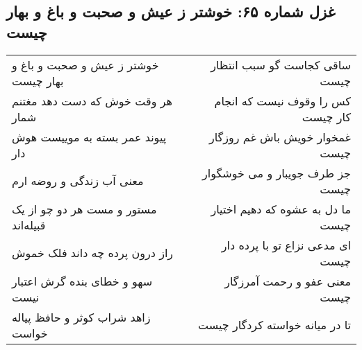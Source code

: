 \begin{center}
\section*{غزل شماره ۶۵: خوشتر ز عیش و صحبت و باغ و بهار چیست}
\label{sec:sh065}
\begin{longtable}{l p{0.5cm} r}
خوشتر ز عیش و صحبت و باغ و بهار چیست
&&
ساقی کجاست گو سبب انتظار چیست
\\
هر وقت خوش که دست دهد مغتنم شمار
&&
کس را وقوف نیست که انجام کار چیست
\\
پیوند عمر بسته به موییست هوش دار
&&
غمخوار خویش باش غم روزگار چیست
\\
معنی آب زندگی و روضه ارم
&&
جز طرف جویبار و می خوشگوار چیست
\\
مستور و مست هر دو چو از یک قبیله‌اند
&&
ما دل به عشوه که دهیم اختیار چیست
\\
راز درون پرده چه داند فلک خموش
&&
ای مدعی نزاع تو با پرده دار چیست
\\
سهو و خطای بنده گرش اعتبار نیست
&&
معنی عفو و رحمت آمرزگار چیست
\\
زاهد شراب کوثر و حافظ پیاله خواست
&&
تا در میانه خواسته کردگار چیست
\\
\end{longtable}
\end{center}
